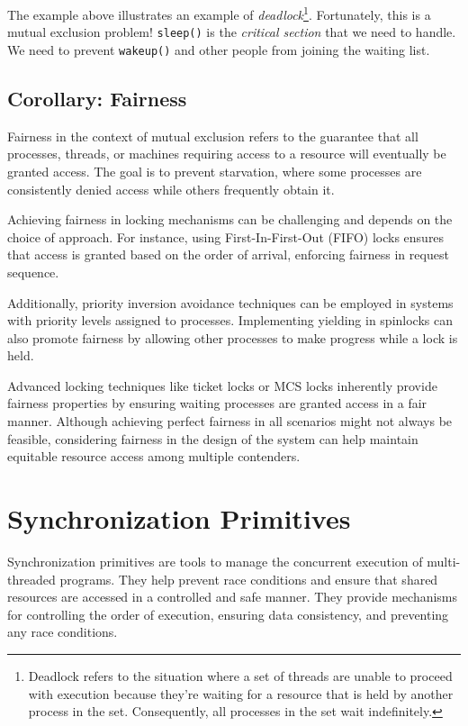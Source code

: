 \documentclass{report}
\begin{document}
The example above illustrates an example of \textit{deadlock}\footnote{Deadlock refers to the
  situation where a set of threads are unable to proceed with execution because they're waiting for
  a resource that is held by another process in the set. Consequently, all processes in the set wait
  indefinitely.}. Fortunately, this is a mutual exclusion problem! \texttt{sleep()} is the
\textit{critical section} that we need to handle. We need to prevent \texttt{wakeup()} and other
people from joining the waiting list.





\section*{Corollary: Fairness}
Fairness in the context of mutual exclusion refers to the guarantee that all processes, threads, or
machines requiring access to a resource will eventually be granted access. The goal is to prevent
starvation, where some processes are consistently denied access while others frequently obtain it.

Achieving fairness in locking mechanisms can be challenging and depends on the choice of
approach. For instance, using First-In-First-Out (FIFO) locks ensures that access is granted based
on the order of arrival, enforcing fairness in request sequence.

Additionally, priority inversion avoidance techniques can be employed in systems with priority
levels assigned to processes. Implementing yielding in spinlocks can also promote fairness by
allowing other processes to make progress while a lock is held.

Advanced locking techniques like ticket locks or MCS locks inherently provide fairness properties by
ensuring waiting processes are granted access in a fair manner. Although achieving perfect fairness
in all scenarios might not always be feasible, considering fairness in the design of the system can
help maintain equitable resource access among multiple contenders. 










\chapter{Synchronization Primitives}
Synchronization primitives are tools to manage the concurrent execution of multi-threaded
programs. They help prevent race conditions and ensure that shared resources are accessed in a
controlled and safe manner. They provide mechanisms for controlling the order of execution, ensuring
data consistency, and preventing any race conditions.
\end{document}
